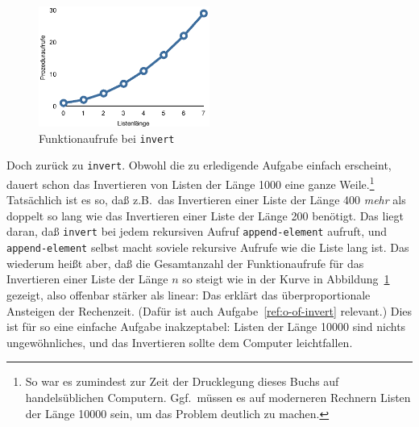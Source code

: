 %
\begin{figure}[tb]
  \centering
  \includegraphics[width=0.5\textwidth]{invert-calls.eps}
  \caption{Funktionaufrufe bei \texttt{invert}}
  \label{fig:invert-calls}
\end{figure}
%
Doch zurück zu \texttt{invert}.  Obwohl die zu erledigende Aufgabe
einfach erscheint, dauert schon das Invertieren von Listen der Länge
1000 eine ganze Weile.\footnote{So war es zumindest zur Zeit der
  Drucklegung dieses Buchs auf handelsüblichen Computern.  Ggf.\
  müssen es auf moderneren Rechnern Listen der Länge 10000 sein, um
  das Problem deutlich zu machen.}  
Tatsächlich ist es so, daß z.B.\
das Invertieren einer Liste der Länge 400 \emph{mehr} als doppelt so
lang wie das Invertieren einer Liste der Länge 200 benötigt.  Das
liegt daran, daß \texttt{invert} bei jedem rekursiven Aufruf
\texttt{append-element} aufruft, und \texttt{append-element} selbst
macht soviele rekursive Aufrufe wie die Liste lang ist.  Das wiederum
heißt aber, daß die Gesamtanzahl der Funktionaufrufe für das
Invertieren einer Liste der Länge $n$ so steigt wie in
der Kurve in Abbildung~\ref{fig:invert-calls} gezeigt, also offenbar
stärker als linear: Das erklärt das überproportionale Ansteigen der
Rechenzeit.  (Dafür ist auch Aufgabe~\ref{ref:o-of-invert} relevant.)
Dies ist für so eine einfache Aufgabe
inakzeptabel: Listen der Länge 10000 sind nichts ungewöhnliches, und
das Invertieren sollte dem Computer leichtfallen.

